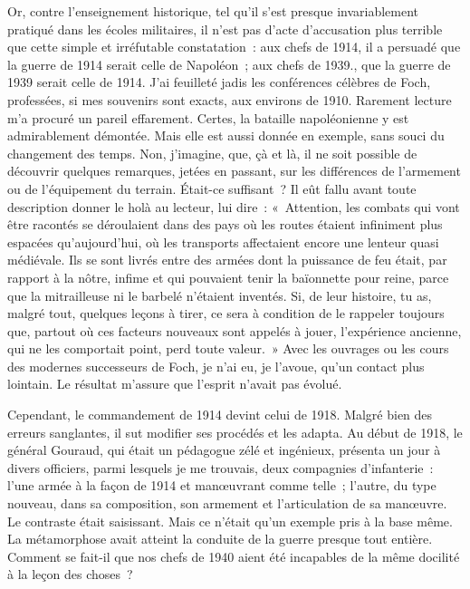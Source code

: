 \documentclass[french,twoside]{book} %
\begin{document}
Or, contre l’enseignement historique, tel qu’il s’est presque invariablement pratiqué dans les écoles militaires, il n’est pas d’acte d’accusation plus terrible que cette simple et irréfutable constatation : aux chefs de 1914, il a persuadé que la guerre de 1914 serait celle de Napoléon ; aux chefs de 1939., que la guerre de 1939 serait celle de 1914. J’ai feuilleté jadis les conférences célèbres de Foch, professées, si mes souvenirs sont exacts, aux environs de 1910. Rarement lecture m’a procuré un pareil effarement. Certes, la bataille napoléonienne y est admirablement démontée. Mais elle est aussi donnée en exemple, sans souci du changement des temps. Non, j’imagine, que, çà et là, il ne soit possible de découvrir quelques remarques, jetées en passant, sur les différences de l’armement ou de l’équipement du terrain. Était-ce suffisant ? Il eût fallu avant toute description donner le holà au lecteur, lui dire : « Attention, les combats qui vont être racontés se déroulaient dans des pays où les routes étaient infiniment plus espacées qu’aujourd’hui, où les transports affectaient   encore une lenteur quasi médiévale. Ils se sont livrés entre des armées dont la puissance de feu était, par rapport à la nôtre, infime et qui pouvaient tenir la baïonnette pour reine, parce que la mitrailleuse ni le barbelé n’étaient inventés. Si, de leur histoire, tu as, malgré tout, quelques leçons à tirer, ce sera à condition de le rappeler toujours que, partout où ces facteurs nouveaux sont appelés à jouer, l’expérience ancienne, qui ne les comportait point, perd toute valeur. » Avec les ouvrages ou les cours des modernes successeurs de Foch, je n’ai eu, je l’avoue, qu’un contact plus lointain. Le résultat m’assure que l’esprit n’avait pas évolué.\par
Cependant, le commandement de 1914 devint celui de 1918. Malgré bien des erreurs sanglantes, il sut modifier ses procédés et les adapta. Au début de 1918, le général Gouraud, qui était un pédagogue zélé et ingénieux, présenta un jour à divers officiers, parmi lesquels je me trouvais, deux compagnies d’infanterie : l’une armée à la façon de 1914 et manœuvrant comme telle ; l’autre, du type nouveau, dans sa composition, son armement et l’articulation de sa manœuvre. Le contraste était saisissant. Mais ce n’était qu’un exemple pris à la base même. La métamorphose avait atteint la conduite de la guerre presque tout entière. Comment se fait-il que nos chefs de 1940 aient été incapables de la même docilité à la leçon des choses ?\par
\end{document}
